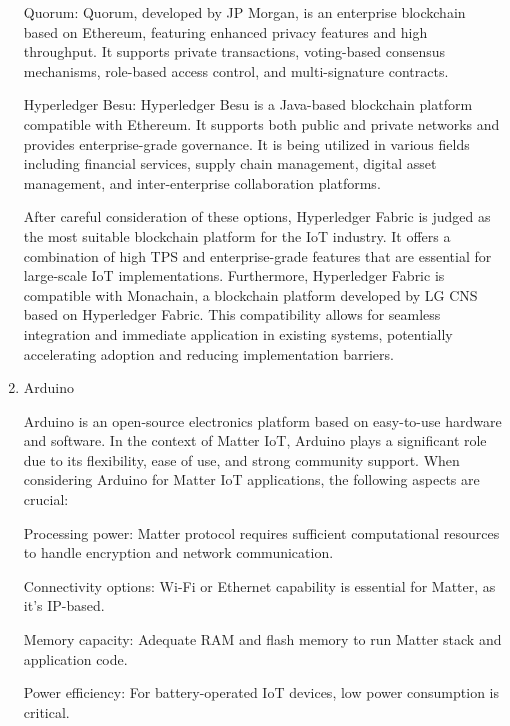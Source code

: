 \documentclass[conference]{IEEEtran}
\begin{document}
\begin{enumerate}[itemsep=2ex, parsep=1ex]
	      Quorum: Quorum, developed by JP Morgan, is an enterprise blockchain based
	      on Ethereum, featuring enhanced privacy features and high throughput. It
	      supports private transactions, voting-based consensus mechanisms, role-based
	      access control, and multi-signature contracts.
	      	      	      
	      Hyperledger Besu: Hyperledger Besu is a Java-based blockchain platform
	      compatible with Ethereum. It supports both public and private networks and
	      provides enterprise-grade governance. It is being utilized in various
	      fields including financial services, supply chain management, digital
	      asset management, and inter-enterprise collaboration platforms.
	      	      	      
	      After careful consideration of these options, Hyperledger Fabric is judged
	      as the most suitable blockchain platform for the IoT industry. It offers a
	      combination of high TPS and enterprise-grade features that are essential for
	      large-scale IoT implementations. Furthermore, Hyperledger Fabric is compatible
	      with Monachain, a blockchain platform developed by LG CNS based on
	      Hyperledger Fabric. This compatibility allows for seamless integration and
	      immediate application in existing systems, potentially accelerating
	      adoption and reducing implementation barriers.
	      	      	      
	\item Arduino
	      	      	      
	      Arduino is an open-source electronics platform based on easy-to-use
	      hardware and software. In the context of Matter IoT, Arduino plays a
	      significant role due to its flexibility, ease of use, and strong community
	      support. When considering Arduino for Matter IoT applications, the
	      following aspects are crucial:
	      	      	      
	      Processing power: Matter protocol requires sufficient computational resources
	      to handle encryption and network communication.
	      	      	      
	      Connectivity options: Wi-Fi or Ethernet capability is essential for Matter,
	      as it's IP-based.
	      	      	      
	      Memory capacity: Adequate RAM and flash memory to run Matter stack and
	      application code.
	      	      	      
	      Power efficiency: For battery-operated IoT devices, low power consumption
	      is critical.
	      	      	      

\end{enumerate}
\end{document}
